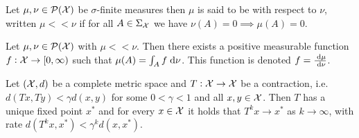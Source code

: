 \begin{defn}
  Let $\mu, \nu \in \mathcal{P}(\mathcal{X})$ be $\sigma$-finite measures
  then $\mu$ is said to be  with respect to 
  $\nu$, written $\mu << \nu$ if for all $A \in \Sigma_\mathcal{X}$ we have
  $\nu(A)=0 \implies \mu(A)=0$.
  \label{defn:absContMeas}
\end{defn}

\begin{thm}
  Let $\mu, \nu \in \mathcal{P}(\mathcal{X})$ with $\mu << \nu$.
  Then there exists a positive measurable function
  $f : \mathcal{X} \to [0, \infty)$
  such that $\mu(A) = \int_A f \; \mathrm{d} \nu$.
  This function is denoted $f = \frac{\; \mathrm{d} \mu}{\; \mathrm{d} \nu}$.
  \label{thm:radonNiko}
\end{thm}

\begin{thm}
  Let $(\mathcal{X}, d)$ be a complete metric space
  and $T:\mathcal{X} \to \mathcal{X}$ be a contraction,
  i.e. $d(Tx, Ty)<\gamma d(x, y)$ for some $0 < \gamma < 1$
  and all $x,y \in \mathcal{X}$.
  Then $T$ has a unique fixed point $x^*$ and for every $x\in \mathcal{X}$
  it holds that $T^k x \to x^*$ as $k \to \infty$, with rate
  $d(T^k x, x^*) < \gamma^k d(x, x^*)$.
  \label{thm:BanachFP}
\end{thm}

